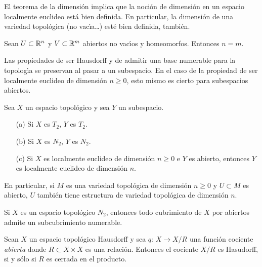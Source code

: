 El teorema de la dimensi\'{o}n implica que la noci\'{o}n de dimensi\'{o}n en
un espacio localmente euclideo est\'{a} bien definida. En particular,
la dimensi\'{o}n de una variedad topol\'{o}gica (no vac\'{\i}a\dots)
est\'{e} bien definida, tambi\'{e}n.

\begin{teoDeLaDim}[de la dimensi\'{o}n]\label{thm:deladim}
	Sean $U\subset\mathbb{R}^{n}$ y $V\subset\mathbb{R}^{m}$ abiertos no
	vac\'{\i}os y homeomorfos. Entonces $n=m$.
\end{teoDeLaDim}

Las propiedades de ser Hausdorff y de admitir una base numerable para la
topolog\'{\i}a se preservan al pasar a un subespacio. En el caso de la
propiedad de ser localmente euclideo de dimensi\'{o}n $n\geq 0$, esto
mismo es cierto para subespacios abiertos.

\begin{propoAbiertoEsLocEuc}\label{thm:abiertoesloceuc}
	Sea $X$ un espacio topol\'{o}gico y sea $Y$ un subespacio.
	\begin{itemize}
		\item[(a)] Si $X$ es $T_{2}$, $Y$ es $T_{2}$.
		\item[(b)] Si $X$ es $N_{2}$, $Y$ es $N_{2}$.
		\item[(c)] Si $X$ es localmente euclideo de dimensi\'{o}n
			$n\geq 0$ e $Y$ es abierto, entonces $Y$ es
			localmente euclideo de dimensi\'{o}n $n$.
	\end{itemize}
	En particular, si $M$ es una variedad topol\'{o}gica de dimensi\'{o}n
	$n\geq 0$ y $U\subset M$ es abierto, $U$ tambi\'{e}n tiene estructura
	de variedad topol\'{o}gica de dimensi\'{o}n $n$.
\end{propoAbiertoEsLocEuc}

\begin{lemaNdosImplicaSubcubNumerable}\label{thm:subcubnum}
	Si $X$ es un espacio topol\'{o}gico $N_{2}$, entonces todo cubrimiento
	de $X$ por abiertos admite un subcubrimiento numerable.
\end{lemaNdosImplicaSubcubNumerable}

\begin{lemaCocienteHaus}\label{thm:cocientehaus}
	Sean $X$ un espacio topol\'{o}gico Hausdorff y sea
	$q:\,X\rightarrow X/R$ una funci\'{o}n cociente \emph{abierta}
	donde $R\subset X\times X$ es una relaci\'{o}n. Entonces el
	cociente $X/R$ es Hasudorff, si y s\'{o}lo si $R$ es cerrada en
	el producto.
\end{lemaCocienteHaus}

